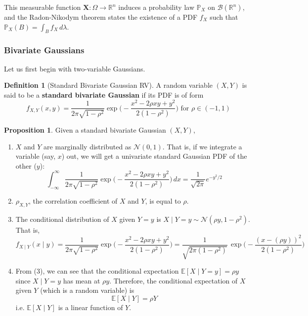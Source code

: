 \documentclass{article}
\theoremstyle{definition}
\newtheorem{proposition}[theorem]{Proposition}
\theoremstyle{remark}
\theoremstyle{definition}
\newtheorem{definition}{Definition}[section]
\begin{document}
This measurable function $\mathbf{X}: \Omega \rightarrow \mathbb{R}^n$ induces a probability law $\mathbb{P}_X$ on $\mathcal{B}(\mathbb{R}^n)$, and the Radon-Nikodym theorem states the existence of a PDF $f_X$ such that $\mathbb{P}_X (B) = \int_B f_X \,d\lambda$.

\subsubsection{Bivariate Gaussians}
Let us first begin with two-variable Gaussians. 

\begin{definition}[Standard Bivariate Gaussian RV]
A random variable $(X, Y)$ is said to be a \textbf{standard bivariate Gaussian} if its PDF is of form
\[f_{X, Y} (x, y) = \frac{1}{2 \pi \sqrt{1 - \rho^2}} \exp \bigg( -\frac{x^2 - 2 \rho x y + y^2}{2 (1 - \rho^2)} \bigg) \text{ for } \rho \in (-1, 1)\] 
\end{definition}

\begin{proposition}
Given a standard bivariate Gaussian $(X, Y)$, 
\begin{enumerate}
    \item $X$ and $Y$ are marginally distributed as $\mathcal{N}(0, 1)$. That is, if we integrate a variable (say, $x$) out, we will get a univariate standard Gaussian PDF of the other ($y$): 
    \[\int_{-\infty}^\infty \frac{1}{2 \pi \sqrt{1 - \rho^2}} \exp \bigg( -\frac{x^2 - 2 \rho x y + y^2}{2 (1 - \rho^2)}\bigg) \,dx = \frac{1}{\sqrt{2 \pi}} e^{-y^2 / 2}\]
    \item $\rho_{X, Y}$, the correlation coefficient of $X$ and $Y$, is equal to $\rho$. 
    \item The conditional distribution of $X$ given $Y = y$ is $X \mid Y = y \sim \mathcal{N} (\rho y, 1 - \rho^2)$. That is, 
    \[f_{X \mid Y} (x \mid y) = \frac{1}{2 \pi \sqrt{1 - \rho^2}} \exp \bigg( -\frac{x^2 - 2 \rho x y + y^2}{2 (1 - \rho^2)}\bigg) = \frac{1}{ \sqrt{2 \pi (1 - \rho^2)}} \, \exp\bigg( - \frac{(x - (\rho y))^2}{2 (1 - \rho^2)} \bigg)\]
    \item From (3), we can see that the conditional expectation $\mathbb{E}[X \mid Y = y] = \rho y$ since $X \mid Y = y$ has mean at $\rho y$. Therefore, the conditional expectation of $X$ given $Y$ (which is a random variable) is 
    \[\mathbb{E}[X \mid Y] = \rho Y\]
    i.e. $\mathbb{E}[X \mid Y]$ is a linear function of $Y$. 
\end{enumerate}
\end{proposition}
\end{document}

